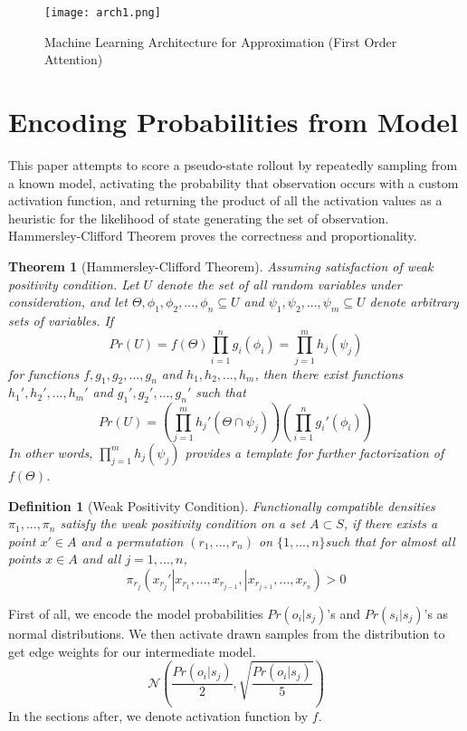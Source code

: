\documentclass[10pt, conference, compsocconf]{IEEEtran}
\newtheorem{theorem}{Theorem}
\newtheorem{definition}{Definition}
\begin{document}
\begin{figure}[ht!]
  \texttt{[image: arch1.png]}
    \caption{Machine Learning Architecture for Approximation (First Order Attention)}
\end{figure}

 
\section{Encoding Probabilities from Model}
This paper attempts to score a pseudo-state rollout by repeatedly sampling from a known model, activating the probability that observation occurs with a custom activation function, and returning the product of all the activation values as a heuristic for the likelihood of state generating the set of observation. Hammersley-Clifford Theorem proves the correctness and proportionality.

\begin{theorem} [Hammersley-Clifford Theorem]
Assuming satisfaction of weak positivity condition. Let $U$ denote the set of all random variables under consideration, and let $\Theta, \phi_1, \phi_2, ..., \phi_n \subseteq U$ and  $\psi_1, \psi_2, ..., \psi_m \subseteq U$ denote arbitrary sets of variables. If
$$Pr(U) = f(\Theta)\prod_{i=1}^{n} g_{i}(\phi_i) = \prod_{j=1}^m h_j(\psi_j)$$
for functions $f, g_1, g_2, ..., g_n$ and $h_1, h_2, ..., h_m$, then there exist functions $h_1', h_2',..., h_m'$ and $g_1', g_2',..., g_n'$ such that 
$$Pr(U) = (\prod_{j=1}^m h_j'(\Theta \cap \psi_j))(\prod_{i=1}^ng_i'(\phi_i))$$
In other words, $\prod_{j=1}^m h_j(\psi_j)$ provides a template for further factorization of $f(\Theta)$.
\end{theorem}

\begin{definition} [Weak Positivity Condition]
Functionally compatible densities $\pi_1, ..., \pi_n$ satisfy the weak positivity condition on a set $A \subset S$, if there exists a point $x' \in A$ and a permutation $(r_1, ..., r_n)$ on $\{1, ..., n\}$such that for almost all points $x \in A$ and all $j = 1, ..., n$,
$$
\pi_{r_j}(x_{r_j}' | x_{r_1}, ..., x_{r_{j-1}}, | x_{r_{j+1}}, ..., x_{r_n}) > 0
$$
\end{definition}
First of all, we encode the model probabilities $Pr(o_i|s_j)$'s and $Pr(s_i|s_j)$'s as normal distributions. We then activate drawn samples from the distribution to get edge weights for our intermediate model.
\begin{equation}
    \mathcal{N}(\frac {Pr(o_i|s_j)}{2}, \sqrt{\frac {Pr(o_i|s_j)}{5}})
\end{equation}
In the sections after, we denote activation function by $f$.
\end{document}
